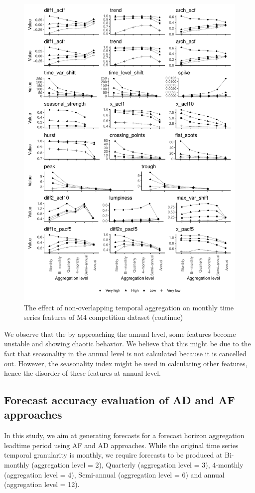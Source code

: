 \documentclass[]{elsarticle} %
\begin{document}
\begin{figure}[H]

{\centering \includegraphics[width=0.7\linewidth]{img/mp_category_all2} 

}

\caption{The effect of non-overlapping temporal aggregation on monthly time series features of M4 competition dataset (continue)}\label{fig:featureagg2}
\end{figure}

We observe that the by approaching the annual level, some features
become unstable and showing chaotic behavior. We believe that this might
be due to the fact that seasonality in the annual level is not
calculated because it is cancelled out. However, the seasonality index
might be used in calculating other features, hence the disorder of these
features at annual level.

\hypertarget{forecast-accuracy-evaluation-of-ad-and-af-approaches}{%
\subsection{Forecast accuracy evaluation of AD and AF
approaches}\label{forecast-accuracy-evaluation-of-ad-and-af-approaches}}

In this study, we aim at generating forecasts for a forecast horizon
aggregation leadtime period using AF and AD approaches. While the
original time series temporal granularity is monthly, we require
forecasts to be produced at Bi-monthly (aggregation level = 2),
Quarterly (aggregation level = 3), 4-monthly (aggregation level = 4),
Semi-annual (aggregation level = 6) and annual (aggregation level = 12).
\end{document}
